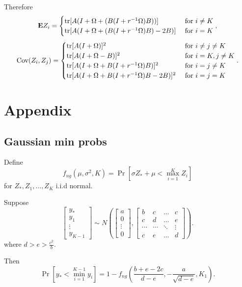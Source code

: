 \documentclass[12pt]{article}
\begin{document}
Therefore
\[
\textbf{E} Z_i = \begin{cases}
\text{tr}[A (I + \Omega + (B(I + r^{-1}\Omega) B))] & \text{ for }i \neq K\\
\text{tr}[A (I + \Omega + (B(I + r^{-1}\Omega) B) - 2B)] & \text{ for }i = K
\end{cases},
\]
\[
\text{Cov}(Z_i, Z_j) = 
\begin{cases}
\text{tr}[A (I + \Omega)]^2 & \text{ for }i \neq j \neq K\\
\text{tr}[A (I + \Omega - B)]^2 & \text{ for }i =K, j \neq K\\
\text{tr}[A (I + \Omega + B(I + r^{-1}\Omega) B)]^2 & \text{ for }i=j \neq K\\
\text{tr}[A (I + \Omega + B(I + r^{-1}\Omega) B - 2B)]^2 & \text{ for }i=j=K
\end{cases}.
\]

\section{Appendix}

\subsection{Gaussian min probs}

Define
\[
f_{ng}(\mu,\sigma^2, K) = \Pr[\sigma Z_* + \mu < \max_{i=1}^K Z_i]
\]
for $Z_*, Z_1,\hdots, Z_K$ i.i.d normal.

Suppose
\[
\begin{bmatrix}
y_* \\
y_1 \\
\vdots \\
y_{K-1}
\end{bmatrix}
\sim
N\left(
\begin{bmatrix}
a\\
0\\
\vdots \\
0
\end{bmatrix},
\begin{bmatrix}
b & c & \hdots & c\\
c & d & \hdots & e\\
\cdots & \cdots & \ddots & \vdots\\
c & e & \hdots & d
\end{bmatrix}
\right).
\]
where $d > e > \frac{c^2}{b}$.

Then
\[
\Pr[y_* < \min_{i=1}^{K-1} y_i] = 1- f_{ng}\left(\frac{b + e- 2c}{d-e}, -\frac{a}{\sqrt{d-e}}, K_1\right).
\]
\end{document}
